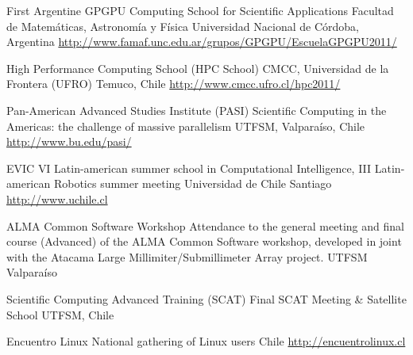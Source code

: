\documentclass[12pt,a4paper]{moderncv}
\newcommand{\gray}{\textcolor{gray}}
\newcommand{\myurl}[1]{\gray{\url{#1}}}
\begin{document}
        {First Argentine GPGPU Computing School for Scientific Applications}
        {Facultad de Matemáticas, Astronomía y Física}
        {Universidad Nacional de Córdoba, Argentina}
        {\myurl{http://www.famaf.unc.edu.ar/grupos/GPGPU/EscuelaGPGPU2011/}}
        {}

        {High Performance Computing School}
        {(HPC School)}
        {CMCC, Universidad de la Frontera (UFRO)}
        {Temuco, Chile}
        {\myurl{http://www.cmcc.ufro.cl/hpc2011/}}

        {Pan-American Advanced Studies Institute}
        {(PASI)}
        {Scientific Computing in the Americas: the challenge of massive parallelism}
        {UTFSM, Valparaíso, Chile}
        {\myurl{http://www.bu.edu/pasi/}}

        {EVIC}
        {VI Latin-american summer school in Computational Intelligence, %
         III Latin-american Robotics summer meeting}
        {Universidad de Chile}
        {Santiago}
        {\myurl{http://www.uchile.cl}}

        {ALMA Common Software Workshop}
        {Attendance to the general meeting and final course (Advanced) of the ALMA
        Common Software workshop, developed in joint with the Atacama Large
        Millimiter/Submillimeter Array project.}
        {UTFSM}
        {Valparaíso}
        {}

        {Scientific Computing Advanced Training}
        {(SCAT)}
        {Final SCAT Meeting \& Satellite School}
        {UTFSM, Chile}
        {}

        {Encuentro Linux}
        {National gathering of Linux users}
        {Chile}
        {}
        {\myurl{http://encuentrolinux.cl}}

\renewcommand*{\listitemsymbol}{\hspace{2em}\labelitemi~}
\end{document}
